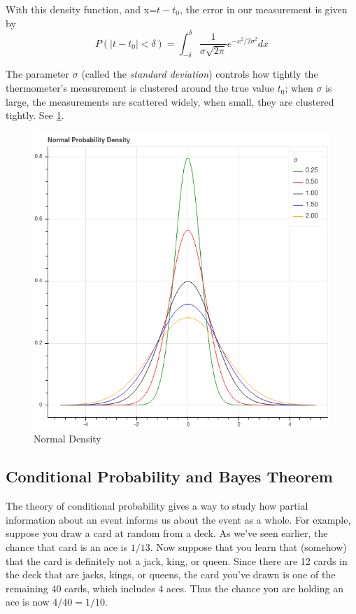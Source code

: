 \documentclass[
]{article}
\begin{document}
With this density function, and x=\(t-t_0\), the error in our
measurement is given by \begin{equation}
P(|t-t_0|<\delta)=\int_{-\delta}^{\delta} \frac{1}{\sigma\sqrt{2\pi}}e^{-x^2/2\sigma^2} dx
\label{eq:normal}\end{equation}

The parameter \(\sigma\) (called the \emph{standard deviation}) controls
how tightly the thermometer's measurement is clustered around the true
value \(t_0\); when \(\sigma\) is large, the measurements are scattered
widely, when small, they are clustered tightly. See \cref{fig:density}.

\begin{figure}
\hypertarget{fig:density}{%
\centering
\includegraphics{../img/density.png}
\caption{Normal Density}\label{fig:density}
}
\end{figure}

\hypertarget{conditional-probability-and-bayes-theorem}{%
\subsection{Conditional Probability and Bayes
Theorem}\label{conditional-probability-and-bayes-theorem}}

The theory of conditional probability gives a way to study how partial
information about an event informs us about the event as a whole. For
example, suppose you draw a card at random from a deck. As we've seen
earlier, the chance that card is an ace is \(1/13\). Now suppose that
you learn that (somehow) that the card is definitely not a jack, king,
or queen. Since there are 12 cards in the deck that are jacks, kings, or
queens, the card you've drawn is one of the remaining 40 cards, which
includes 4 aces. Thus the chance you are holding an ace is now
\(4/40=1/10\).
\end{document}
